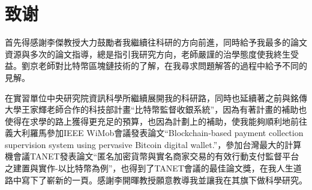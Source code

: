 
\chapter{致谢}
首先得感謝李傑教授大力鼓勵者我繼續往科研的方向前進，同時給予我最多的論文資源與多次的論文指導，總是指引我研究方向，老師嚴謹的治學態度使我終生受益。劉京老師對比特幣區塊鏈技術的了解，在我尋求問題解答的過程中給予不同的見解。

在實習單位中央研究院資訊科學所繼續展開我的科研路，同時也延續著之前與銘傳大學王家輝老師合作的科技部計畫“比特幣監督收銀系統”，因為有著計畫的補助也使得在求學的路上獲得更充足的預算，也因為計劃上的補助，使我能夠順利地前往義大利羅馬參加IEEE WiMob會議發表論文“Blockchain-based payment collection supervision system using pervasive Bitcoin digital wallet.”\supercite{Blockchain-basedpaymentcollectionsupervisionsystemusingpervasiveBitcoindigitalwallet}，參加台灣最大的計算機會議TANET發表論文“匿名加密貨幣與實名商家交易的有效行動支付監督平台之建置與實作-以比特幣為例”，也得到了TANET會議的最佳論文獎，在我人生道路中寫下了嶄新的一頁。感謝李開暉教授願意教導我並讓我在其旗下做科學研究。